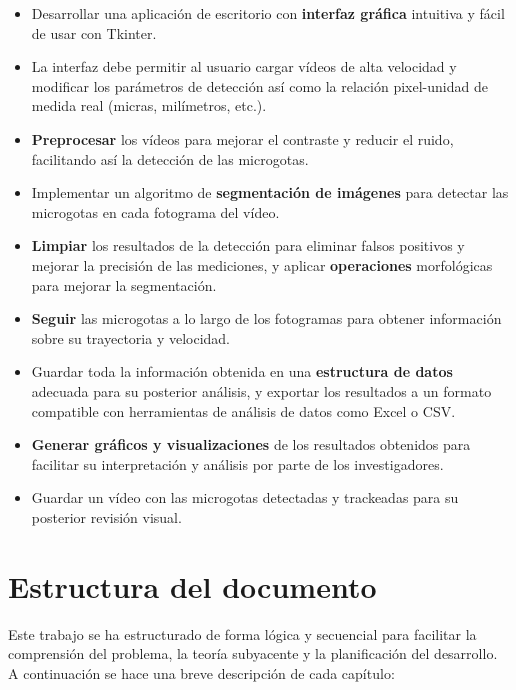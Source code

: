 \begin{itemize}
    \item Desarrollar una aplicación de escritorio con \textbf{interfaz gráfica} intuitiva y fácil de usar con Tkinter.
    \item La interfaz debe permitir al usuario cargar vídeos de alta velocidad y modificar los parámetros de detección así como la relación pixel-unidad de medida real (micras, milímetros, etc.).
    \item \textbf{Preprocesar} los vídeos para mejorar el contraste y reducir el ruido, facilitando así la detección de las microgotas.
    \item Implementar un algoritmo de \textbf{segmentación de imágenes} para detectar las microgotas en cada fotograma del vídeo.
    \item \textbf{Limpiar} los resultados de la detección para eliminar falsos positivos y mejorar la precisión de las mediciones, y aplicar \textbf{operaciones} morfológicas para mejorar la segmentación.
    \item \textbf{Seguir} las microgotas a lo largo de los fotogramas para obtener información sobre su trayectoria y velocidad.
    \item Guardar toda la información obtenida en una \textbf{estructura de datos} adecuada para su posterior análisis, y exportar los resultados a un formato compatible con herramientas de análisis de datos como Excel o CSV.
    \item \textbf{Generar gráficos y visualizaciones} de los resultados obtenidos para facilitar su interpretación y análisis por parte de los investigadores.
    \item Guardar un vídeo con las microgotas detectadas y trackeadas para su posterior revisión visual.
\end{itemize}

\section{Estructura del documento}

Este trabajo se ha estructurado de forma lógica y secuencial para facilitar la comprensión del problema, la teoría subyacente y la planificación del desarrollo. A continuación se hace una breve descripción de cada capítulo:

